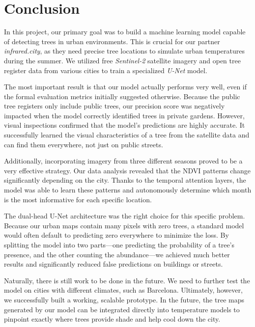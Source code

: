 \section{Conclusion}

In this project, our primary goal was to build a machine learning model capable of detecting trees in urban environments. This is crucial for our partner \textit{infrared.city}, as they need precise tree locations to simulate urban temperatures during the summer. We utilized free \textit{Sentinel-2} satellite imagery and open tree register data from various cities to train a specialized \textit{U-Net} model.

The most important result is that our model actually performs very well, even if the formal evaluation metrics initially suggested otherwise. Because the public tree registers only include public trees, our precision score was negatively impacted when the model correctly identified trees in private gardens. However, visual inspections confirmed that the model's predictions are highly accurate. It successfully learned the visual characteristics of a tree from the satellite data and can find them everywhere, not just on public streets. 

Additionally, incorporating imagery from three different seasons proved to be a very effective strategy. Our data analysis revealed that the NDVI patterns change significantly depending on the city. Thanks to the temporal attention layers, the model was able to learn these patterns and autonomously determine which month is the most informative for each specific location. 

The dual-head U-Net architecture was the right choice for this specific problem. Because our urban maps contain many pixels with zero trees, a standard model would often default to predicting zero everywhere to minimize the loss. By splitting the model into two parts---one predicting the probability of a tree's presence, and the other counting the abundance---we achieved much better results and significantly reduced false predictions on buildings or streets.

Naturally, there is still work to be done in the future. We need to further test the model on cities with different climates, such as Barcelona. Ultimately, however, we successfully built a working, scalable prototype. In the future, the tree maps generated by our model can be integrated directly into temperature models to pinpoint exactly where trees provide shade and help cool down the city.
